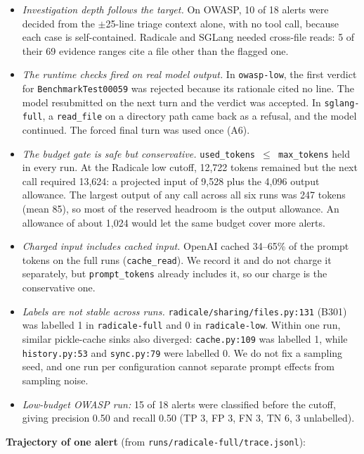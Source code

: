 \documentclass[
  10pt,
]{article}
\providecommand{\tightlist}{%
  \setlength{\itemsep}{0pt}\setlength{\parskip}{0pt}}
\begin{document}
\begin{itemize}
\tightlist
\item
  \emph{Investigation depth follows the target.} On OWASP, 10 of 18
  alerts were decided from the \ensuremath{\pm}25-line triage context alone, with no
  tool call, because each case is self-contained. Radicale and SGLang
  needed cross-file reads: 5 of their 69 evidence ranges cite a file
  other than the flagged one.
\item
  \emph{The runtime checks fired on real model output.} In
  \texttt{owasp-low}, the first verdict for \texttt{BenchmarkTest00059}
  was rejected because its rationale cited no line. The model
  resubmitted on the next turn and the verdict was accepted. In
  \texttt{sglang-full}, a \texttt{read\_file} on a directory path came
  back as a refusal, and the model continued. The forced final turn was
  used once (A6).
\item
  \emph{The budget gate is safe but conservative.}
  \texttt{used\_tokens\ \ensuremath{\leq}\ max\_tokens} held in every run. At the
  Radicale low cutoff, 12,722 tokens remained but the next call required
  13,624: a projected input of 9,528 plus the 4,096 output allowance.
  The largest output of any call across all six runs was 247 tokens
  (mean 85), so most of the reserved headroom is the output allowance.
  An allowance of about 1,024 would let the same budget cover more
  alerts.
\item
  \emph{Charged input includes cached input.} OpenAI cached 34--65\% of
  the prompt tokens on the full runs (\texttt{cache\_read}). We record
  it and do not charge it separately, but \texttt{prompt\_tokens}
  already includes it, so our charge is the conservative one.
\item
  \emph{Labels are not stable across runs.}
  \texttt{radicale/sharing/files.py:131} (B301) was labelled 1 in
  \texttt{radicale-full} and 0 in \texttt{radicale-low}. Within one run,
  similar pickle-cache sinks also diverged: \texttt{cache.py:109} was
  labelled 1, while \texttt{history.py:53} and \texttt{sync.py:79} were
  labelled 0. We do not fix a sampling seed, and one run per
  configuration cannot separate prompt effects from sampling noise.
\item
  \emph{Low-budget OWASP run:} 15 of 18 alerts were classified before
  the cutoff, giving precision 0.50 and recall 0.50 (TP 3, FP 3, FN 3,
  TN 6, 3 unlabelled).
\end{itemize}

\clearpage
\textbf{Trajectory of one alert} (from
\texttt{runs/radicale-full/trace.jsonl}):
\end{document}
